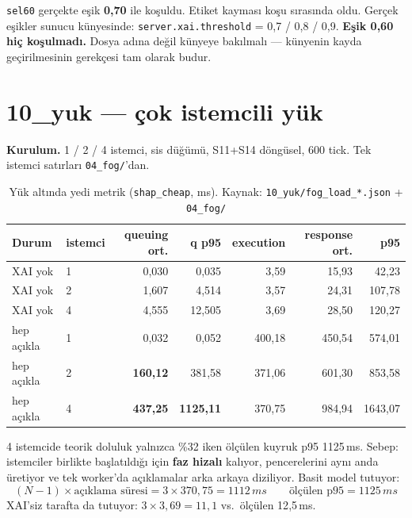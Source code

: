 \documentclass[11pt,a4paper]{report}
\newcommand{\ms}{\,ms}
\newcommand{\kod}[1]{\texttt{\small #1}}
\newcommand{\dosya}[1]{\texttt{\footnotesize #1}}
\begin{document}
\begin{uyari}
\dosya{sel60} gerçekte eşik \textbf{0{,}70} ile koşuldu. Etiket kayması koşu
sırasında oldu. Gerçek eşikler sunucu künyesinde:
\kod{server.xai.threshold} = 0{,}7 / 0{,}8 / 0{,}9. \textbf{Eşik 0{,}60 hiç
koşulmadı.} Dosya adına değil künyeye bakılmalı --- künyenin kayda
geçirilmesinin gerekçesi tam olarak budur.
\end{uyari}

\section{10\_yuk --- çok istemcili yük}

\textbf{Kurulum.} 1 / 2 / 4 istemci, sis düğümü, S11+S14 döngüsel, 600 tick.
Tek istemci satırları \dosya{04\_fog/}'dan.

\begin{table}[H]
\centering\small
\begin{tabular}{@{}llrrrrr@{}}
\toprule
\textbf{Durum} & \textbf{istemci} & \textbf{queuing ort.} & \textbf{q p95} & \textbf{execution} & \textbf{response ort.} & \textbf{p95} \\
\midrule
XAI yok & 1 & 0{,}030 & 0{,}035 & 3{,}59 & 15{,}93 & 42{,}23 \\
XAI yok & 2 & 1{,}607 & 4{,}514 & 3{,}57 & 24{,}31 & 107{,}78 \\
XAI yok & 4 & 4{,}555 & 12{,}505 & 3{,}69 & 28{,}50 & 120{,}27 \\
\midrule
hep açıkla & 1 & 0{,}032 & 0{,}052 & 400{,}18 & 450{,}54 & 574{,}01 \\
hep açıkla & 2 & \textbf{160{,}12} & 381{,}58 & 371{,}06 & 601{,}30 & 853{,}58 \\
hep açıkla & 4 & \textbf{437{,}25} & \textbf{1125{,}11} & 370{,}75 & 984{,}94 & 1643{,}07 \\
\bottomrule
\end{tabular}
\caption{Yük altında yedi metrik (\kod{shap\_cheap}, ms).
Kaynak: \dosya{10\_yuk/fog\_load\_*.json} + \dosya{04\_fog/}}
\end{table}

\begin{bulgu}
4 istemcide teorik doluluk yalnızca \%32 iken ölçülen kuyruk p95 1125\ms.
Sebep: istemciler birlikte başlatıldığı için \textbf{faz hizalı} kalıyor,
pencerelerini aynı anda üretiyor ve tek worker'da açıklamalar arka arkaya
diziliyor. Basit model tutuyor:
\[
(N-1)\times\text{açıklama süresi} = 3 \times 370{,}75 = 1112\ms
\qquad \text{ölçülen p95} = 1125\ms
\]
XAI'siz tarafta da tutuyor: $3 \times 3{,}69 = 11{,}1$ vs.\ ölçülen 12{,}5\ms.
\end{bulgu}
\end{document}

